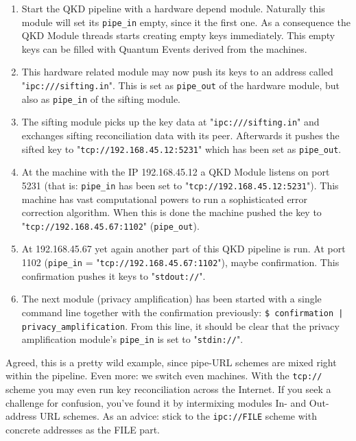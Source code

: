 \begin{enumerate}

\item Start the QKD pipeline with a hardware depend module. Naturally this module will set its \texttt{pipe\_in} empty, since it the first one. As a consequence the QKD Module threads starts creating empty keys immediately. This empty keys can be filled with Quantum Events derived from the machines.

\item This hardware related module may now push its keys to an address called "\texttt{ipc:///sifting.in}". This is set as \texttt{pipe\_out} of the hardware module, but also as \texttt{pipe\_in} of the sifting module.

\item The sifting module picks up the key data at "\texttt{ipc:///sifting.in}" and exchanges sifting reconciliation data with its peer. Afterwards it pushes the sifted key to "\texttt{tcp://192.168.45.12:5231}" which has been set as \texttt{pipe\_out}. 

\item At the machine with the IP 192.168.45.12 a QKD Module listens on port 5231 (that is: \texttt{pipe\_in} has been set to "\texttt{tcp://192.168.45.12:5231}"). This machine has vast computational powers to run a sophisticated error correction algorithm. When this is done the machine pushed the key to "\texttt{tcp://192.168.45.67:1102}" (\texttt{pipe\_out}).

\item At 192.168.45.67 yet again another part of this QKD pipeline is run. At port 1102 (\texttt{pipe\_in} = "\texttt{tcp://192.168.45.67:1102}"), maybe confirmation. This confirmation pushes it keys to "\texttt{stdout://}".

\item The next module (privacy amplification) has been started with a single command line together with the confirmation previously: \texttt{\$ confirmation | privacy\_amplification}. From this line, it should be clear that the privacy amplification module's \texttt{pipe\_in} is set to "\texttt{stdin://}".

\end{enumerate}

Agreed, this is a pretty wild example, since pipe-URL schemes are mixed right within the pipeline. Even more: we switch even machines. With the \texttt{tcp://} scheme you may even run key reconciliation across the Internet. If you seek a challenge for confusion, you've found it by intermixing modules In- and Out- address URL schemes. As an advice: stick to the \texttt{ipc://FILE} scheme with concrete addresses as the FILE part.

